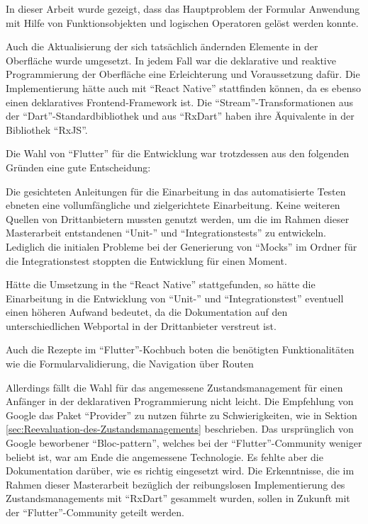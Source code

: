 

In dieser Arbeit wurde gezeigt, dass  das Hauptproblem der Formular Anwendung mit Hilfe von Funktionsobjekten und logischen Operatoren gelöst werden konnte. 

Auch die  Aktualisierung der sich tatsächlich ändernden Elemente in der Oberfläche wurde umgesetzt.
In jedem Fall war die deklarative und reaktive Programmierung der Oberfläche eine Erleichterung und Voraussetzung dafür.
Die Implementierung hätte auch mit \enquote{React Native} stattfinden können,
da es ebenso einen deklaratives Frontend-Framework ist.
Die \enquote{Stream}-Transformationen aus der \enquote{Dart}-Standardbibliothek und aus \enquote{RxDart} haben ihre Äquivalente in der Bibliothek \enquote{RxJS}.

Die Wahl von \enquote{Flutter} für die Entwicklung war trotzdessen aus den folgenden Gründen eine gute Entscheidung:

Die gesichteten Anleitungen für die Einarbeitung in das automatisierte Testen ebneten eine vollumfängliche und zielgerichtete Einarbeitung.
Keine weiteren Quellen von Drittanbietern mussten genutzt werden,
um die im Rahmen dieser Masterarbeit entstandenen \enquote{Unit-} und \enquote{Integrationstests} zu entwickeln.
Lediglich die initialen Probleme bei der Generierung von \enquote{Mocks} im Ordner für die Integrationstest stoppten die Entwicklung für einen Moment.

Hätte die Umsetzung in the \enquote{React Native} stattgefunden,
so hätte die Einarbeitung in die Entwicklung von \enquote{Unit-} und \enquote{Integrationstest} eventuell einen höheren Aufwand bedeutet,
da die Dokumentation auf den unterschiedlichen Webportal in der Drittanbieter verstreut ist.

Auch die Rezepte im \enquote{Flutter}-Kochbuch boten die benötigten Funktionalitäten wie die Formularvalidierung,
die Navigation über Routen 

Allerdings fällt die Wahl für das angemessene Zustandsmanagement für einen Anfänger in der deklarativen Programmierung nicht leicht.
Die Empfehlung von Google das Paket \enquote{Provider} zu nutzen führte zu Schwierigkeiten,
wie in Sektion \ref{sec:Reevaluation-des-Zustandsmanagements}
beschrieben.
Das ursprünglich von Google beworbener \enquote{Bloc-pattern},
welches bei der \enquote{Flutter}-Community weniger beliebt ist,
war am Ende die angemessene Technologie.
Es fehlte aber die Dokumentation darüber,
wie es richtig eingesetzt wird.
Die Erkenntnisse,
die im Rahmen dieser Masterarbeit bezüglich der reibungslosen Implementierung des Zustandsmanagements mit \enquote{RxDart} gesammelt wurden,
sollen in Zukunft mit der \enquote{Flutter}-Community geteilt werden.

